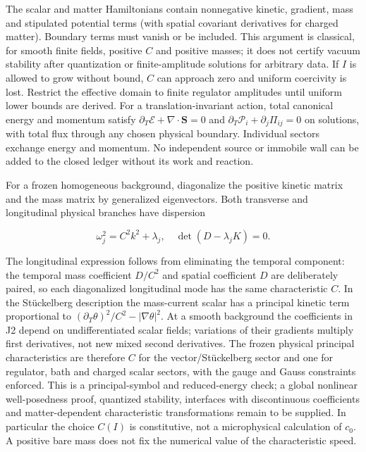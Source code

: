 \documentclass[
  11pt,
  twoside]{article}
\begin{document}
The scalar and matter Hamiltonians contain nonnegative kinetic,
gradient, mass and stipulated potential terms (with spatial covariant
derivatives for charged matter). Boundary terms must vanish or be
included. This argument is classical, for smooth finite fields, positive
\(C\) and positive masses; it does not certify vacuum stability after
quantization or finite-amplitude solutions for arbitrary data. If \(I\)
is allowed to grow without bound, \(C\) can approach zero and uniform
coercivity is lost. Restrict the effective domain to finite regulator
amplitudes until uniform lower bounds are derived. For a
translation-invariant action, total canonical energy and momentum
satisfy \(\partial_T\mathcal E+\nabla\cdot\mathbf S=0\) and
\(\partial_T\mathcal P_i+\partial_j\Pi_{ij}=0\) on solutions, with total
flux through any chosen physical boundary. Individual sectors exchange
energy and momentum. No independent source or immobile wall can be added
to the closed ledger without its work and reaction.

For a frozen homogeneous background, diagonalize the positive kinetic
matrix and the mass matrix by generalized eigenvectors. Both transverse
and longitudinal physical branches have dispersion

\[\omega_j^2=C^2 k^2+\lambda_j,\quad
\det(D-\lambda_j K)=0.\tag{J5}\]

The longitudinal expression follows from eliminating the temporal
component: the temporal mass coefficient \(D/C^2\) and spatial
coefficient \(D\) are deliberately paired, so each diagonalized
longitudinal mode has the same characteristic \(C\). In the Stückelberg
description the mass-current scalar has a principal kinetic term
proportional to \((\partial_T\theta)^2/C^2-|\nabla\theta|^2\). At a
smooth background the coefficients in J2 depend on undifferentiated
scalar fields; variations of their gradients multiply first derivatives,
not new mixed second derivatives. The frozen physical principal
characteristics are therefore \(C\) for the vector/Stückelberg sector
and one for regulator, bath and charged scalar sectors, with the gauge
and Gauss constraints enforced. This is a principal-symbol and
reduced-energy check; a global nonlinear well-posedness proof, quantized
stability, interfaces with discontinuous coefficients and
matter-dependent characteristic transformations remain to be supplied.
In particular the choice \(C(I)\) is constitutive, not a microphysical
calculation of \(c_0\). A positive bare mass does not fix the numerical
value of the characteristic speed.
\end{document}
